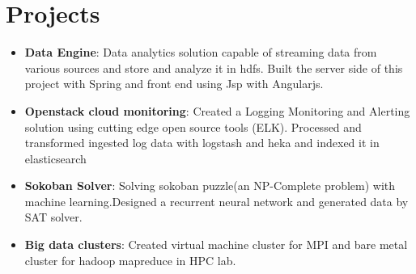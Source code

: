 \documentclass[letterpaper,11pt]{article}
\newcommand{\resumeItem}[2]{
  \item\small{
    \textbf{#1}{: #2 \vspace{-2pt}}
  }
}
\newcommand{\resumeSubItem}[2]{\resumeItem{#1}{#2}\vspace{-4pt}}
\newcommand{\resumeSubHeadingListStart}{\begin{itemize}[leftmargin=*]}
\newcommand{\resumeSubHeadingListEnd}{\end{itemize}}
\begin{document}
\section{Projects}
  \resumeSubHeadingListStart
    \resumeSubItem{Data Engine}
      {Data analytics solution capable of streaming data from various sources and store and analyze it in hdfs.
      Built the server side of this project with Spring and front end using Jsp with Angularjs.}
    \resumeSubItem{Openstack cloud monitoring}
      {Created a Logging Monitoring and Alerting solution using cutting edge open source tools (ELK).
      	Processed and transformed ingested log data with logstash and heka and indexed it in elasticsearch 
      }
    \resumeSubItem{Sokoban Solver}
      {Solving sokoban puzzle(an NP-Complete problem) with machine learning.Designed a recurrent neural network and generated data by SAT solver. 
      }
    \resumeSubItem{Big data clusters}
      {Created virtual machine cluster for MPI and bare metal cluster for hadoop mapreduce in HPC lab.}
  \resumeSubHeadingListEnd

%


\end{document}
